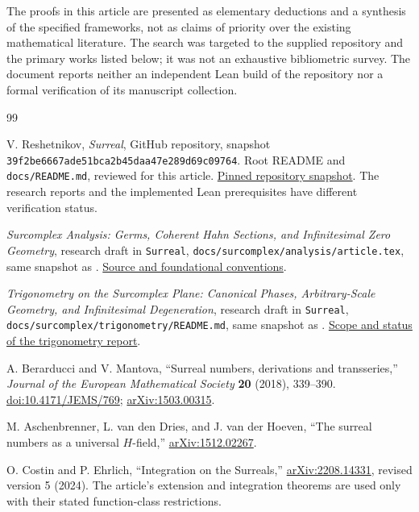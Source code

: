 \documentclass[11pt,a4paper]{article}
\numberwithin{equation}{section}
\theoremstyle{definition}
\theoremstyle{remark}
\newcommand{\arxiv}[1]{\href{https://arxiv.org/abs/#1}{arXiv:#1}}
\newcommand{\doi}[1]{\href{https://doi.org/#1}{doi:#1}}
\begin{document}
The proofs in this article are presented as elementary deductions and a synthesis of the specified frameworks, not as claims of priority over the existing mathematical literature. The search was targeted to the supplied repository and the primary works listed below; it was not an exhaustive bibliometric survey. The document reports neither an independent Lean build of the repository nor a formal verification of its manuscript collection.

\clearpage
\begin{thebibliography}{99}
\small\raggedright
\setlength{\itemsep}{3pt}\setlength{\parskip}{0pt}

V. Reshetnikov, \emph{Surreal}, GitHub repository, snapshot
\texttt{39f2be6667ade51bca2b45daa47e289d69c09764}.
Root README and \texttt{docs/README.md}, reviewed for this article.
\href{https://github.com/VladimirReshetnikov/Surreal/tree/39f2be6667ade51bca2b45daa47e289d69c09764}{Pinned repository snapshot}.
The research reports and the implemented Lean prerequisites have different verification status.

\emph{Surcomplex Analysis: Germs, Coherent Hahn Sections, and Infinitesimal Zero Geometry}, research draft in \texttt{Surreal},
\texttt{docs/surcomplex/analysis/article.tex}, same snapshot as \cite{Repo}.
\href{https://github.com/VladimirReshetnikov/Surreal/blob/39f2be6667ade51bca2b45daa47e289d69c09764/docs/surcomplex/analysis/article.tex}{Source and foundational conventions}.

\emph{Trigonometry on the Surcomplex Plane: Canonical Phases, Arbitrary-Scale Geometry, and Infinitesimal Degeneration}, research draft in \texttt{Surreal},
\texttt{docs/surcomplex/trigonometry/README.md}, same snapshot as \cite{Repo}.
\href{https://github.com/VladimirReshetnikov/Surreal/blob/39f2be6667ade51bca2b45daa47e289d69c09764/docs/surcomplex/trigonometry/README.md}{Scope and status of the trigonometry report}.

A. Berarducci and V. Mantova,
``Surreal numbers, derivations and transseries,''
\emph{Journal of the European Mathematical Society} \textbf{20} (2018), 339--390.
\doi{10.4171/JEMS/769}; \arxiv{1503.00315}.

M. Aschenbrenner, L. van den Dries, and J. van der Hoeven,
``The surreal numbers as a universal $H$-field,''
\arxiv{1512.02267}.

O. Costin and P. Ehrlich,
``Integration on the Surreals,''
\arxiv{2208.14331}, revised version 5 (2024).
The article's extension and integration theorems are used only with their stated function-class restrictions.


\end{thebibliography}
\end{document}
